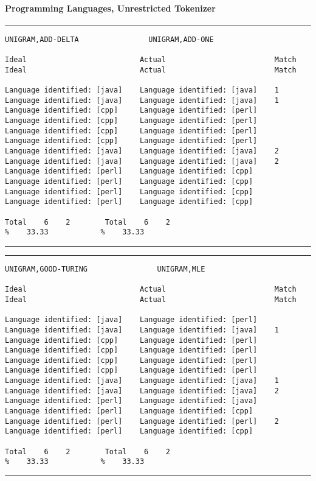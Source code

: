 \clearpage

\paragraph{Programming Languages, Unrestricted Tokenizer}

\tiny
\hrule\vskip4pt
\begin{verbatim}
UNIGRAM,ADD-DELTA                UNIGRAM,ADD-ONE

Ideal                          Actual                         Match  Ideal                          Actual                         Match

Language identified: [java]    Language identified: [java]    1      Language identified: [java]    Language identified: [java]    1
Language identified: [cpp]     Language identified: [perl]           Language identified: [cpp]     Language identified: [perl]
Language identified: [cpp]     Language identified: [perl]           Language identified: [cpp]     Language identified: [perl]
Language identified: [java]    Language identified: [java]    2      Language identified: [java]    Language identified: [java]    2
Language identified: [perl]    Language identified: [cpp]            Language identified: [perl]    Language identified: [cpp]
Language identified: [perl]    Language identified: [cpp]            Language identified: [perl]    Language identified: [cpp]

Total    6    2        Total    6    2
%    33.33            %    33.33
\end{verbatim}
\vskip4pt\hrule

\tiny
\hrule\vskip4pt
\begin{verbatim}
UNIGRAM,GOOD-TURING                UNIGRAM,MLE

Ideal                          Actual                         Match  Ideal                          Actual                         Match

Language identified: [java]    Language identified: [perl]           Language identified: [java]    Language identified: [java]    1
Language identified: [cpp]     Language identified: [perl]           Language identified: [cpp]     Language identified: [perl]
Language identified: [cpp]     Language identified: [perl]           Language identified: [cpp]     Language identified: [perl]
Language identified: [java]    Language identified: [java]    1      Language identified: [java]    Language identified: [java]    2
Language identified: [perl]    Language identified: [java]           Language identified: [perl]    Language identified: [cpp]
Language identified: [perl]    Language identified: [perl]    2      Language identified: [perl]    Language identified: [cpp]

Total    6    2        Total    6    2
%    33.33            %    33.33
\end{verbatim}
\vskip4pt\hrule

